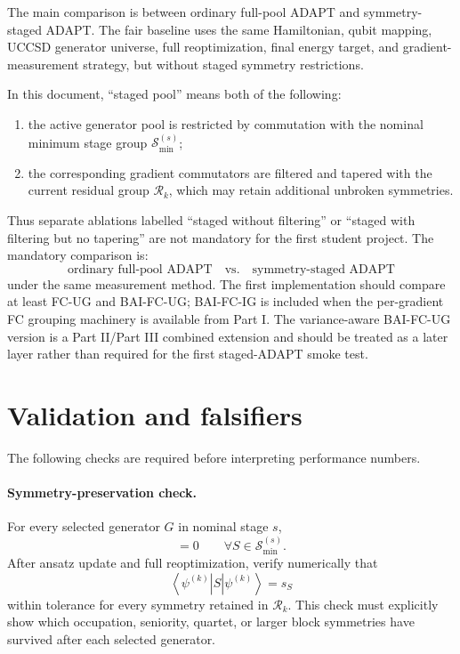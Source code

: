 \documentclass[11pt]{article}
\newcommand{\ket}[1]{\left|#1\right\rangle}
\newcommand{\bra}[1]{\left\langle#1\right|}
\newcommand{\minsym}{\mathcal S_{\min}^{(s)}}
\newcommand{\resgrp}{\mathcal R_k}
\begin{document}
The main comparison is between ordinary full-pool ADAPT and symmetry-staged ADAPT. The fair baseline uses the same Hamiltonian, qubit mapping, UCCSD generator universe, full reoptimization, final energy target, and gradient-measurement strategy, but without staged symmetry restrictions.

In this document, ``staged pool'' means both of the following:
\begin{enumerate}[label=(\roman*),leftmargin=2.4em]
    \item the active generator pool is restricted by commutation with the nominal minimum stage group $\minsym$;
    \item the corresponding gradient commutators are filtered and tapered with the current residual group $\resgrp$, which may retain additional unbroken symmetries.
\end{enumerate}
Thus separate ablations labelled ``staged without filtering'' or ``staged with filtering but no tapering'' are not mandatory for the first student project. The mandatory comparison is:
\begin{equation}
    \text{ordinary full-pool ADAPT}
    \quad\text{vs.}\quad
    \text{symmetry-staged ADAPT}
\end{equation}
under the same measurement method. The first implementation should compare at least FC-UG and BAI-FC-UG; BAI-FC-IG is included when the per-gradient FC grouping machinery is available from Part I. The variance-aware BAI-FC-UG version is a Part II/Part III combined extension and should be treated as a later layer rather than required for the first staged-ADAPT smoke test.

\section{Validation and falsifiers}

The following checks are required before interpreting performance numbers.

\paragraph{Symmetry-preservation check.}
For every selected generator $G$ in nominal stage $s$,
\begin{equation}
    [G,S]=0\qquad \forall S\in\minsym.
\end{equation}
After ansatz update and full reoptimization, verify numerically that
\begin{equation}
    \bra{\psi^{(k)}}S\ket{\psi^{(k)}}=s_S
\end{equation}
within tolerance for every symmetry retained in $\resgrp$. This check must explicitly show which occupation, seniority, quartet, or larger block symmetries have survived after each selected generator.
\end{document}
